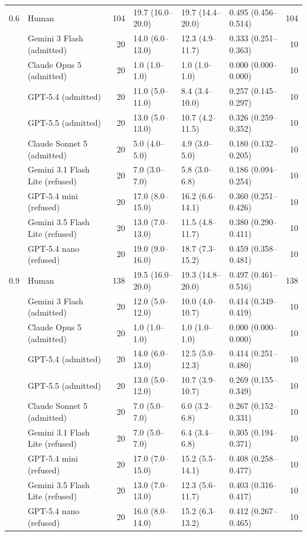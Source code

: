 \documentclass{article}
\begin{document}
\begin{table}[t]
\begin{tabular}{@{}llrlllr@{}}
        \midrule
        0.6 & Human & 104 & 19.7 (16.0--20.0) & 19.7 (14.4--20.0) & 0.495 (0.456--0.514) & 104 \\
         & Gemini 3 Flash (admitted) & 20 & 14.0 (6.0--13.0) & 12.3 (4.9--11.7) & 0.333 (0.251--0.363) & 10 \\
         & Claude Opus 5 (admitted) & 20 & 1.0 (1.0--1.0) & 1.0 (1.0--1.0) & 0.000 (0.000--0.000) & 10 \\
         & GPT-5.4 (admitted) & 20 & 11.0 (5.0--11.0) & 8.4 (3.4--10.0) & 0.257 (0.145--0.297) & 10 \\
         & GPT-5.5 (admitted) & 20 & 13.0 (5.0--13.0) & 10.7 (4.2--11.5) & 0.326 (0.259--0.352) & 10 \\
         & Claude Sonnet 5 (admitted) & 20 & 5.0 (4.0--5.0) & 4.9 (3.0--5.0) & 0.180 (0.132--0.205) & 10 \\
         & Gemini 3.1 Flash Lite (refused) & 20 & 7.0 (3.0--7.0) & 5.8 (3.0--6.8) & 0.186 (0.094--0.254) & 10 \\
         & GPT-5.4 mini (refused) & 20 & 17.0 (8.0--15.0) & 16.2 (6.6--14.1) & 0.360 (0.251--0.426) & 10 \\
         & Gemini 3.5 Flash Lite (refused) & 20 & 13.0 (7.0--13.0) & 11.5 (4.8--11.7) & 0.380 (0.290--0.411) & 10 \\
         & GPT-5.4 nano (refused) & 20 & 19.0 (9.0--16.0) & 18.7 (7.3--15.2) & 0.459 (0.358--0.481) & 10 \\
        \midrule
        0.9 & Human & 138 & 19.5 (16.0--20.0) & 19.3 (14.8--20.0) & 0.497 (0.461--0.516) & 138 \\
         & Gemini 3 Flash (admitted) & 20 & 12.0 (5.0--12.0) & 10.0 (4.0--10.7) & 0.414 (0.349--0.419) & 10 \\
         & Claude Opus 5 (admitted) & 20 & 1.0 (1.0--1.0) & 1.0 (1.0--1.0) & 0.000 (0.000--0.000) & 10 \\
         & GPT-5.4 (admitted) & 20 & 14.0 (6.0--13.0) & 12.5 (5.0--12.3) & 0.414 (0.251--0.480) & 10 \\
         & GPT-5.5 (admitted) & 20 & 13.0 (5.0--12.0) & 10.7 (3.9--10.7) & 0.269 (0.155--0.349) & 10 \\
         & Claude Sonnet 5 (admitted) & 20 & 7.0 (5.0--7.0) & 6.0 (3.2--6.8) & 0.267 (0.152--0.331) & 10 \\
         & Gemini 3.1 Flash Lite (refused) & 20 & 7.0 (5.0--7.0) & 6.4 (3.4--6.8) & 0.305 (0.194--0.371) & 10 \\
         & GPT-5.4 mini (refused) & 20 & 17.0 (7.0--15.0) & 15.2 (5.5--14.1) & 0.408 (0.258--0.477) & 10 \\
         & Gemini 3.5 Flash Lite (refused) & 20 & 13.0 (7.0--13.0) & 12.3 (5.6--11.7) & 0.403 (0.316--0.417) & 10 \\
         & GPT-5.4 nano (refused) & 20 & 16.0 (8.0--14.0) & 15.2 (6.3--13.2) & 0.412 (0.267--0.465) & 10 \\
        \bottomrule
    \end{tabular}
\end{table}
\end{document}
